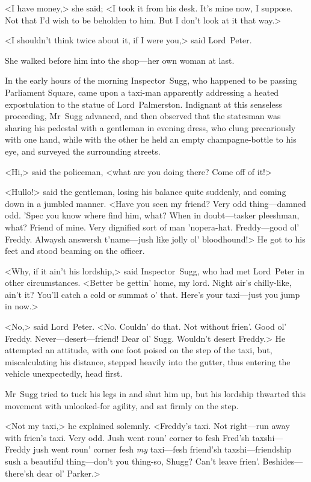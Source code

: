 <I have money,> she said; <I took it from his desk. It's mine now, I suppose. Not that I'd wish to be beholden to him. But I don't look at it that way.>

<I shouldn't think twice about it, if I were you,> said Lord~Peter.

She walked before him into the shop—her own woman at last. 

\divider

In the early hours of the morning Inspector~Sugg, who happened to be passing Parliament Square, came upon a taxi-man apparently addressing a heated expostulation to the statue of Lord~Palmerston. Indignant at this senseless proceeding, Mr~Sugg advanced, and then observed that the statesman was sharing his pedestal with a gentleman in evening dress, who clung precariously with one hand, while with the other he held an empty champagne-bottle to his eye, and surveyed the surrounding streets.

<Hi,> said the policeman, <what are you doing there? Come off of it!>

<Hullo!> said the gentleman, losing his balance quite suddenly, and coming down in a jumbled manner. <Have you seen my friend? Very odd thing—damned odd. 'Spec you know where find him, what? When in doubt—tasker pleeshman, what? Friend of mine. Very dignified sort of man 'nopera-hat. Freddy—good ol' Freddy. Alwaysh answersh t'name—jush like jolly ol' bloodhound!> He got to his feet and stood beaming on the officer.

<Why, if it ain't his lordship,> said Inspector~Sugg, who had met Lord~Peter in other circumstances. <Better be gettin' home, my lord. Night air's chilly-like, ain't it? You'll catch a cold or summat o' that.  Here's your taxi—just you jump in now.>

<No,> said Lord~Peter. <No. Couldn' do that. Not without frien'. Good ol' Freddy. Never—desert—friend! Dear ol' Sugg. Wouldn't desert Freddy.> He attempted an attitude, with one foot poised on the step of the taxi, but, miscalculating his distance, stepped heavily into the gutter, thus entering the vehicle unexpectedly, head first.

Mr~Sugg tried to tuck his legs in and shut him up, but his lordship thwarted this movement with unlooked-for agility, and sat firmly on the step.

<Not my taxi,> he explained solemnly. <Freddy's taxi. Not right—run away with frien's taxi. Very odd. Jush went roun' corner to fesh Fred'sh taxshi—Freddy jush went roun' corner fesh \emph{my} taxi—fesh friend'sh taxshi—friendship sush a beautiful thing—don't you thing-so, Shugg? Can't leave frien'. Beshides—there'sh dear ol' Parker.>

